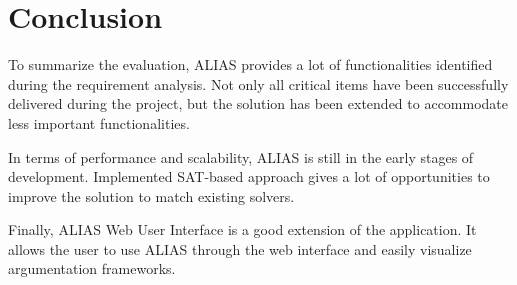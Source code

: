 \section{Conclusion}
To summarize the evaluation, ALIAS provides a lot of functionalities identified during the requirement analysis. Not only all critical items have been successfully delivered during the project, but the solution has been extended to accommodate less important functionalities. 

In terms of performance and scalability, ALIAS is still in the early stages of development. Implemented SAT-based approach gives a lot of opportunities to improve the solution to match existing solvers.

Finally, ALIAS Web User Interface is a good extension of the application. It allows the user to use ALIAS through the web interface and easily visualize argumentation frameworks.